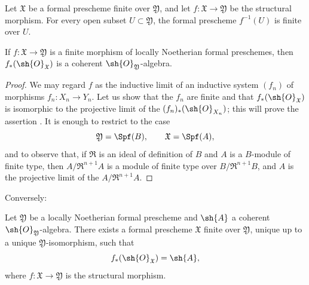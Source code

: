 \begin{corollary}[4.8.5]
\label{III.4.8.5}
Let $\mathfrak{X}$ be a formal prescheme finite over
$\mathfrak{Y}$, and let
$f:\mathfrak{X}\to\mathfrak{Y}$ be the structural morphism.  For
every open subset $U\subset\mathfrak{Y}$, the formal prescheme
$f^{-1}(U)$ is finite over $U$.
\end{corollary}

\begin{proposition}[4.8.6]
\label{III.4.8.6}
If $f:\mathfrak{X}\to\mathfrak{Y}$ is a finite morphism of locally
Noetherian formal preschemes, then
$f_*(\sh{O}_{\mathfrak{X}})$ is a coherent
$\sh{O}_{\mathfrak{Y}}$-algebra.
\end{proposition}

\begin{proof}
We may regard $f$ as the inductive limit of an inductive system
$(f_n)$ of morphisms $f_n:X_n\to Y_n$.  Let us show that the
$f_n$ are finite and that $f_*(\sh{O}_{\mathfrak{X}})$ is
isomorphic to the projective limit of the
$(f_n)_*(\sh{O}_{X_n})$; this will prove the assertion
.  It is enough to restrict to the case
\[
  \mathfrak{Y}=\Spf(B),\qquad \mathfrak{X}=\Spf(A),
\]
and to observe that, if $\mathfrak{R}$ is an ideal of definition
of $B$ and $A$ is a $B$-module of finite type, then
$A/\mathfrak{R}^{n+1}A$ is a module of finite type over
$B/\mathfrak{R}^{n+1}B$, and $A$ is the projective limit of the
$A/\mathfrak{R}^{n+1}A$.
\end{proof}

Conversely:

\begin{proposition}[4.8.7]
\label{III.4.8.7}
Let $\mathfrak{Y}$ be a locally Noetherian formal prescheme and
$\sh{A}$ a coherent $\sh{O}_{\mathfrak{Y}}$-algebra.  There exists
a formal prescheme $\mathfrak{X}$ finite over $\mathfrak{Y}$,
unique up to a unique $\mathfrak{Y}$-isomorphism, such that
\[
  f_*(\sh{O}_{\mathfrak{X}})=\sh{A},
\]
where $f:\mathfrak{X}\to\mathfrak{Y}$ is the structural morphism.
\end{proposition}

